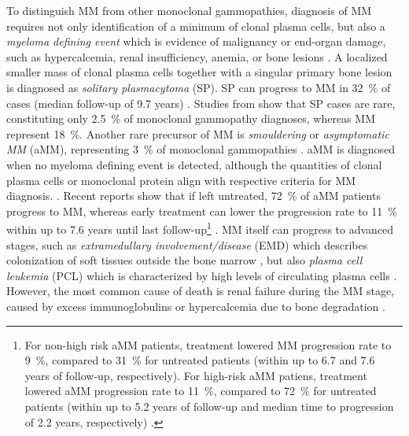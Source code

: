 To distinguish MM from other monoclonal gammopathies, diagnosis of MM requires
not only identification of a minimum of clonal plasma cells, but also a
\emph{myeloma defining event} which is evidence of malignancy or end-organ
damage, such as hypercalcemia, renal insufficiency, anemia, or bone lesions
\cite{rajkumarInternationalMyelomaWorking2014}. A localized
smaller mass of clonal plasma
cells together with a singular primary bone lesion is diagnosed as
\emph{solitary plasmacytoma} (SP). SP can progress to MM in \SI{32}{\percent} of
cases  (median follow-up of 9.7 years)
\cite{thumallapallySolitaryPlasmacytomaPopulationbased2017,
    gaoSolitaryBonePlasmacytoma2024}. Studies from
\citet{kyleMonoclonalGammopathyUndetermined1997} show that SP cases are rare,
constituting only \SI{2.5}{\percent} of monoclonal gammopathy diagnoses, whereas
MM represent \SI{18}{\percent}. Another rare precursor of MM is
\textit{smouldering} or \textit{asymptomatic MM} (aMM), representing
\SI{3}{\percent} of monoclonal gammopathies
\cite{kyleMonoclonalGammopathyUndetermined1997}. aMM is diagnosed when no
myeloma defining event is detected, although the quantities of clonal plasma
cells or monoclonal protein align with respective criteria for MM diagnosis.
\cite{rajkumarInternationalMyelomaWorking2014}. Recent reports show that if left
untreated, \SI{72}{\percent} of aMM patients progress to MM, whereas early
treatment can lower the progression rate to \SI{11}{\percent} within up to 7.6
years until last follow-up\footnote{For non-high risk aMM patients, treatment
    lowered MM progression rate to \SI{9}{\percent}, compared to \SI{31}{\percent}
    for untreated patients (within up to 6.7 and 7.6 years of follow-up,
    respectively). For high-risk aMM patiens, treatment lowered aMM progression rate
    to \SI{11}{\percent}, compared to \SI{72}{\percent} for untreated patients
    (within up to 5.2 years of follow-up and median time to progression of 2.2
    years, respectively) \cite{abdallahModeProgressionSmoldering2024}.}
\cite{abdallahModeProgressionSmoldering2024,
    mateosmaria-victoriaLenalidomideDexamethasoneHighRisk2013}. MM itself can
progress to advanced stages, such as \emph{extramedullary involvement/disease}
(EMD) which describes colonization of soft tissues outside the bone marrow
\cite{bladeExtramedullaryDiseaseMultiple2022}, but also \emph{plasma cell
    leukemia} (PCL) which is characterized by high levels of circulating plasma
cells \cite{jungUpdatePrimaryPlasma2022}. However, the most common cause of
death is renal failure during the MM stage, caused by excess immunoglobulins or
hypercalcemia due to bone degradation \cite{kunduMultipleMyelomaRenal2022}.

